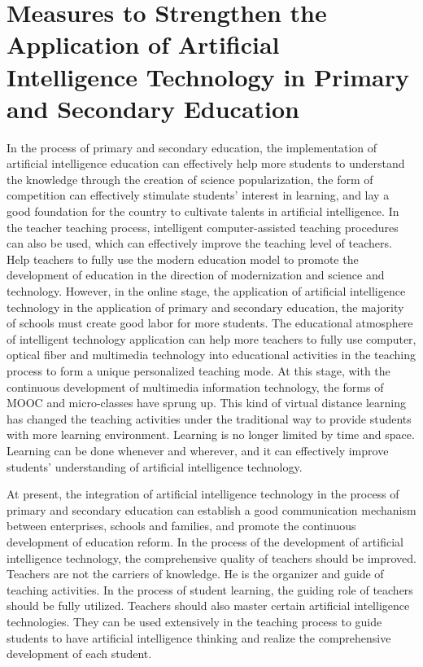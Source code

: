 \documentclass[11pt,en,authoryear]{elegantpaper}
\begin{document}
\section{Measures to Strengthen the Application of Artificial Intelligence Technology in Primary and Secondary Education}
In the process of primary and secondary education, the implementation of artificial intelligence education can effectively help more students to understand the knowledge through the creation of science popularization, the form of competition can effectively stimulate students' interest in learning, and lay a good foundation for the country to cultivate talents in artificial intelligence. In the teacher teaching process, intelligent computer-assisted teaching procedures can also be used, which can effectively improve the teaching level of teachers. Help teachers to fully use the modern education model to promote the development of education in the direction of modernization and science and technology. However, in the online stage, the application of artificial intelligence technology in the application of primary and secondary education, the majority of schools must create good labor for more students. The educational atmosphere of intelligent technology application can help more teachers to fully use computer, optical fiber and multimedia technology into educational activities in the teaching process to form a unique personalized teaching mode. At this stage, with the continuous development of multimedia information technology, the forms of MOOC and micro-classes have sprung up. This kind of virtual distance learning has changed the teaching activities under the traditional way to provide students with more learning environment. Learning is no longer limited by time and space. Learning can be done whenever and wherever, and it can effectively improve students' understanding of artificial intelligence technology.

At present, the integration of artificial intelligence technology in the process of primary and secondary education can establish a good communication mechanism between enterprises, schools and families, and promote the continuous development of education reform. In the process of the development of artificial intelligence technology, the comprehensive quality of teachers should be improved. Teachers are not the carriers of knowledge. He is the organizer and guide of teaching activities. In the process of student learning, the guiding role of teachers should be fully utilized. Teachers should also master certain artificial intelligence technologies. They can be used extensively in the teaching process to guide students to have artificial intelligence thinking and realize the comprehensive development of each student.
\end{document}
